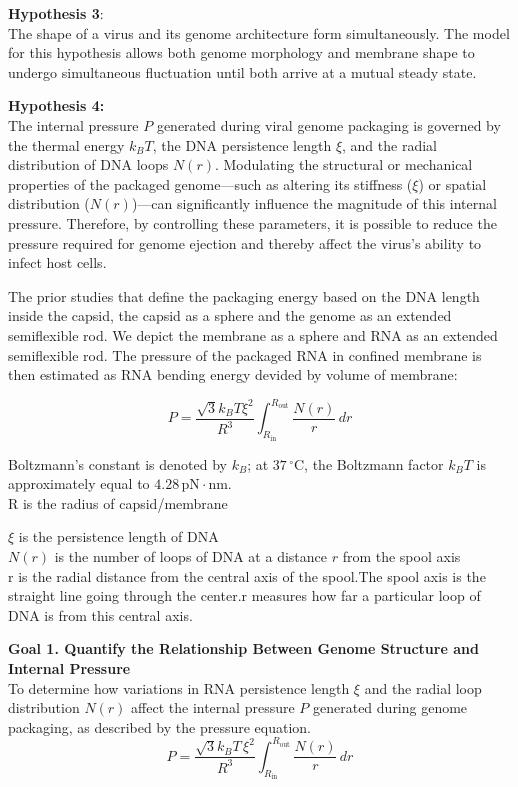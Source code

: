 \documentclass[12pt]{article}
\begin{document}
\begin{flushleft}
\noindent \textbf{Hypothesis 3}:\\
The shape of a virus and its genome architecture form simultaneously.
The model for this hypothesis allows both genome morphology and membrane shape to undergo simultaneous
fluctuation until both arrive at a mutual steady state.

	
\noindent \textbf{Hypothesis 4:}\\
The internal pressure \( P \) generated during viral genome packaging is governed by the thermal energy \( k_B T \), the DNA persistence length \( \xi \), and the radial distribution of DNA loops \( N(r) \). Modulating the structural or mechanical properties of the packaged genome—such as altering its stiffness (\( \xi \)) or spatial distribution (\( N(r) \))—can significantly influence the magnitude of this internal pressure. Therefore, by controlling these parameters, it is possible to reduce the pressure required for genome ejection and thereby affect the virus’s ability to infect host cells.

The prior studies that define the packaging energy based on the DNA length inside the capsid, the capsid as a sphere and the genome as an extended semiflexible rod\cite{Grayson2006}. We depict the membrane as a sphere and RNA as an extended semiflexible rod. The pressure of the packaged RNA in confined membrane is then estimated as RNA bending energy devided by volume of membrane:

\begin{equation}
P= \frac{\sqrt{3} k_B T \xi^2}{ R^3} \int_{R_{\text{in}}}^{R_{\text{out}}} \frac{N(r)}{r} \, dr 
\end{equation}

Boltzmann's constant is denoted by \( k_B \); at \( 37\,^\circ\mathrm{C} \), the Boltzmann factor \( k_B T \) is approximately equal to \( 4.28\, \mathrm{pN} \cdot \mathrm{nm} \).\\
R is the radius of capsid/membrane

\(\xi\) is the persistence length of DNA\\
\(N(r)\) is the number of loops of DNA at a distance \(r\) from the spool axis\\
r is the radial distance from the central axis of the spool.The spool axis is the straight line going through the center.r measures how far a particular loop of DNA is from this central axis.


\noindent \textbf{Goal 1. Quantify the Relationship Between Genome Structure and Internal Pressure} \\
To determine how variations in RNA persistence length \( \xi \) and the radial loop distribution \( N(r) \) affect the internal pressure \( P \) generated during genome packaging, as described by the pressure equation.
\[
P = \frac{\sqrt{3} k_B T \, \xi^2}{R^3} \int_{R_\text{in}}^{R_\text{out}} \frac{N(r)}{r} \, dr
\]





\end{flushleft}
\end{document}
